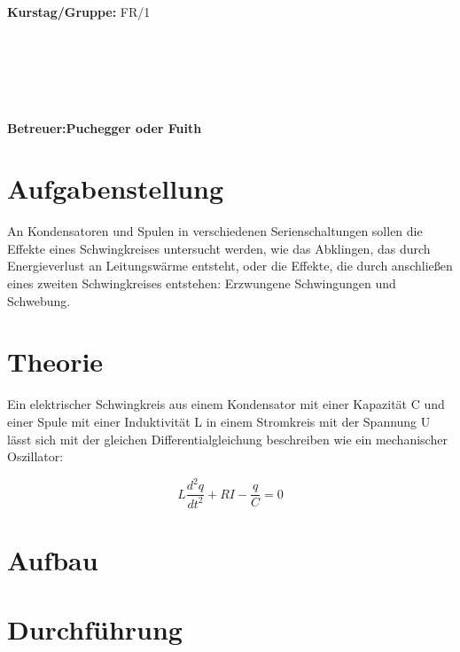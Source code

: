 \documentclass{article}
\begin{document}
\begin{verbatim}


\end{verbatim}
			\begin{flushleft}
			\textbf{\Large{Kurstag/Gruppe:}} \Large{FR/1}
			\end{flushleft}

\begin{verbatim}






\end{verbatim}
			\begin{flushleft}
			\LARGE{\textbf{Betreuer:\Large{Puchegger oder Fuith}}}		
			\end{flushleft}
			
\section{Aufgabenstellung}
An Kondensatoren und Spulen in verschiedenen Serienschaltungen sollen die Effekte eines Schwingkreises untersucht werden, wie das Abklingen, das durch Energieverlust an Leitungswärme entsteht, oder die Effekte, die durch anschließen eines zweiten Schwingkreises entstehen: Erzwungene Schwingungen und Schwebung.
\section{Theorie}
Ein elektrischer Schwingkreis aus einem Kondensator mit einer Kapazität C und einer Spule mit einer Induktivität L in einem Stromkreis mit der Spannung U lässt sich mit der gleichen Differentialgleichung beschreiben wie ein mechanischer Oszillator:

\begin{equation}
\label{HarmOsz}
L\frac{d^2q}{dt^2}+RI-\frac{q}{C}=0
\end{equation}
\section{Aufbau}

\section{Durchführung}
\end{document}
